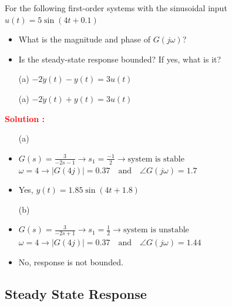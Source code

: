 \documentclass[12pt]{article}
\begin{document}
For the following first-order systems with the sinusoidal input \(u(t) = 5 \sin(4t+0.1)\)
\begin{itemize}
    \item What is the magnitude and phase of \(G(j\omega)\)?
    \item Is the steady-state response bounded? If yes, what is it?
    \item[(a)] \(-2\dot{y}(t) - y(t) = 3 u(t)\)
        \item[(a)] \(-2\dot{y}(t) + y(t) = 3 u(t)\)
\end{itemize}
\textbf{\textcolor{red}{Solution :}}
\begin{itemize}
    \item[(a)] 
    \item \(G(s) = \frac{3}{-2s-1} \rightarrow s_1 = \frac{-1}{2} \rightarrow \text{system is stable}\) \\ \(\omega = 4 \rightarrow |G(4j)| = 0.37 \quad \text{and} \quad \angle G(j\omega) = 1.7 \)
    \item Yes, \(y(t) = 1.85 \sin(4t+1.8)\)
    \item[(b)]
    \item \(G(s) = \frac{3}{-2s+1} \rightarrow s_1 = \frac{1}{2} \rightarrow \text{system is unstable}\) \\ \(\omega = 4 \rightarrow |G(4j)| = 0.37 \quad \text{and} \quad \angle G(j\omega) = 1.44 \)
    \item No, response is not bounded.
\end{itemize}

\clearpage
\subsection{Steady State Response}
\end{document}
